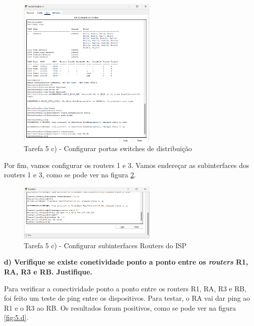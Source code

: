 \documentclass[11pt,english, openright, oneside]{book}
\begin{document}
\begin{figure}[H]
    \centering
    \includegraphics[width=0.6\textwidth]{imagens/Tarefa5/5.c.3.png}
    \caption{Tarefa 5 c) - Configurar portas switches de distribuição}
    \label{fig:5.c.3}
\end{figure}

\vspace{0.2cm}

Por fim, vamos configurar os routers 1 e 3. Vamos endereçar as subinterfaces dos
routers 1 e 3, como se pode ver na figura \ref{fig:5.c.4}.

\begin{figure}[H]
    \centering
    \includegraphics[width=0.6\textwidth]{imagens/Tarefa5/5.c.4.png}
    \caption{Tarefa 5 c) - Configurar subinterfaces Routers do ISP}
    \label{fig:5.c.4}
\end{figure}

\vspace{0.8cm}

\newpage
\textbf{d) Verifique se existe conetividade ponto a ponto entre os
\textit{routers} R1, RA, R3 e RB. Justifique.}
\vspace{0.2cm}

Para verificar a conectividade ponto a ponto entre os routers R1, RA, R3 e RB,
foi feito um teste de ping entre os dispositivos. Para testar, o RA vai dar ping
ao R1 e o R3 ao RB. Os resultados foram positivos, como se pode ver na figura
\ref{fig:5.d}.
\end{document}
